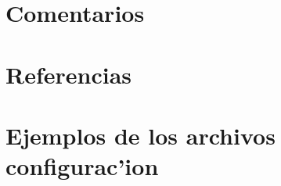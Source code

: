 \documentclass[spanish, a4paper, 10pt, titlepage]{article}
\begin{document}
\section{Comentarios}

\clearpage


\clearpage

\section{Referencias}

\clearpage


\appendix
\section{Ejemplos de los archivos configurac'ion}

\clearpage



\end{document}
